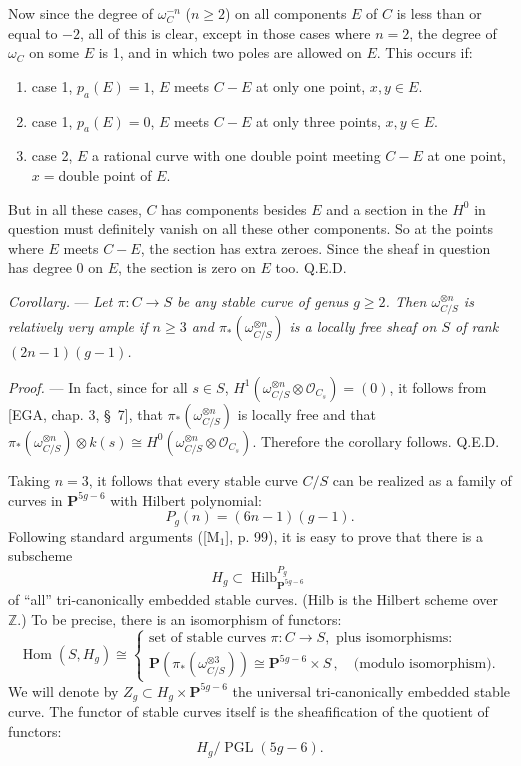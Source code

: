 \documentclass[10pt]{article}
\newcommand{\Hom}{\operatorname{Hom}}
\newcommand{\PGL}{\operatorname{PGL}}
\newcommand{\Hilb}{\operatorname{Hilb}}
\newcommand{\pa}{p_a}
\newcommand{\cO}{\mathcal O}
\newcommand{\PP}{\mathbf P}
\begin{document}
Now since the degree of $\omega_C^{-n}$ ($n\geq 2$) on all components $E$ of $C$ is less than or equal to $-2$, all of this is clear, except in those cases where $n=2$, the degree of $\omega_C$ on some $E$ is 1, and in which two poles are allowed on $E$. This occurs if:
\begin{enumerate}[label=(\roman*)]
\item case 1, $\pa(E)=1$, $E$ meets $C-E$ at only one point, $x,y\in E$.
\item case 1, $\pa(E)=0$, $E$ meets $C-E$ at only three points, $x,y\in E$.
\item case 2, $E$ a rational curve with one double point meeting $C-E$ at one point, $x={}$double point of $E$.
\end{enumerate}
But in all these cases, $C$ has components besides $E$ and a section in the $H^0$ in question must definitely vanish on all these other components. So at the points where $E$ meets $C-E$, the section has extra zeroes. Since the sheaf in question has degree 0 on $E$, the section is zero on $E$ too. Q.E.D.

\medskip
\noindent\textit{Corollary.} --- \textit{Let $\pi:C\to S$ be any stable curve of genus $g\geq 2$. Then $\omega_{C/S}^{\otimes n}$ is relatively very ample if $n\geq 3$ and $\pi_*(\omega_{C/S}^{\otimes n})$ is a locally free sheaf on $S$ of rank $(2n-1)(g-1)$.}

\medskip
\noindent\textit{Proof.} --- In fact, since for all $s\in S$, $H^1(\omega_{C/S}^{\otimes n}\otimes \cO_{C_s})=(0)$, it follows from [EGA, chap. 3, \S~7], that $\pi_*(\omega_{C/S}^{\otimes n})$ is locally free and that $\pi_*(\omega_{C/S}^{\otimes n})\otimes k(s)\cong H^0(\omega_{C/S}^{\otimes n}\otimes \cO_{C_s})$. Therefore the corollary follows. Q.E.D.

Taking $n=3$, it follows that every stable curve $C/S$ can be realized as a family of curves in $\PP^{5g-6}$ with Hilbert polynomial:
\[
P_g(n)=(6n-1)(g-1).
\]
Following standard arguments ([M$_1$], p. 99), it is easy to prove that there is a subscheme
\[
H_g\subset \Hilb_{\PP^{5g-6}}^{P_g}
\]
of ``all'' tri-canonically embedded stable curves. (Hilb is the Hilbert scheme over $\mathbb Z$.) To be precise, there is an isomorphism of functors:
\[
\Hom(S,H_g)\cong
\left\{
\begin{array}{l}
\text{set of stable curves }\pi:C\to S,\text{ plus isomorphisms:}\\[2pt]
\PP(\pi_*(\omega_{C/S}^{\otimes 3}))\cong \PP^{5g-6}\times S\,,\quad\text{(modulo isomorphism).}
\end{array}
\right.
\]
We will denote by $Z_g\subset H_g\times \PP^{5g-6}$ the universal tri-canonically embedded stable curve. The functor of stable curves itself is the sheafification of the quotient of functors:
\[
H_g/\PGL(5g-6).
\]
\end{document}
